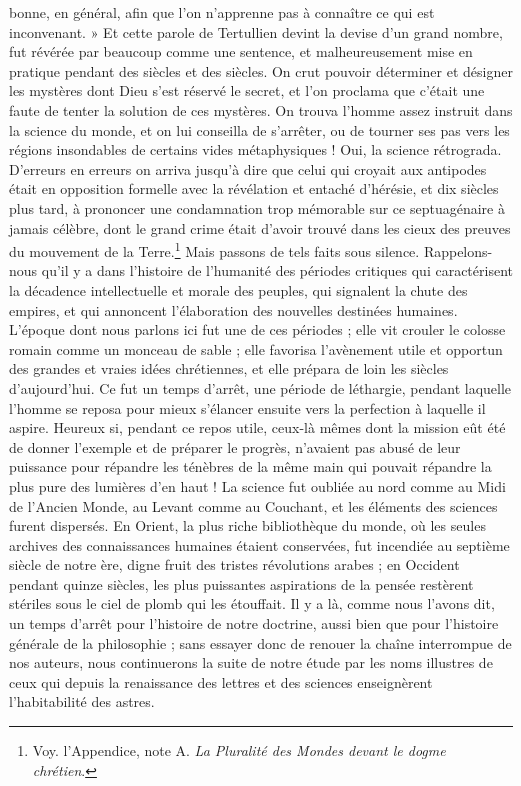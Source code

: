 \documentclass[a4paper, 11pt, oneside]{article}
\begin{document}
bonne, en général, afin que l'on n'apprenne pas à connaître ce qui est inconvenant. » Et cette parole de Tertullien devint la devise d'un grand nombre, fut révérée par beaucoup comme une sentence, et malheureusement mise en pratique pendant des siècles et des siècles. On crut pouvoir déterminer et désigner les mystères dont Dieu s'est réservé le secret, et l'on proclama que c'était une faute de tenter la solution de ces mystères. On trouva l'homme assez instruit dans la science du monde, et on lui conseilla de s'arrêter, ou de tourner ses pas vers les régions insondables de certains vides métaphysiques ! Oui, la science rétrograda. D'erreurs en erreurs on arriva jusqu'à dire que celui qui croyait aux antipodes était en opposition formelle avec la révélation et entaché d'hérésie, et dix siècles plus tard, à prononcer une condamnation trop mémorable sur ce septuagénaire à jamais célèbre, dont le grand crime était d'avoir trouvé dans les cieux des preuves du mouvement de la Terre.\footnote{Voy. l'Appendice, note A. \emph{La Pluralité des Mondes devant le dogme chrétien}.} Mais passons de tels faits sous silence. Rappelons-nous qu'il y a dans l'histoire de l'humanité des périodes critiques qui caractérisent la décadence intellectuelle et morale des peuples, qui signalent la chute des empires, et qui annoncent l'élaboration des nouvelles destinées humaines. L'époque dont nous parlons ici fut une de ces périodes ; elle vit crouler le colosse romain comme un monceau de sable ; elle favorisa l'avènement utile et opportun des grandes et vraies idées chrétiennes, et elle prépara de loin les siècles d'aujourd'hui. Ce fut un temps d'arrêt, une période de léthargie, pendant laquelle l'homme se reposa pour mieux s'élancer ensuite vers la perfection à laquelle il aspire. Heureux si, pendant ce repos utile, ceux-là mêmes dont la mission eût été de donner l'exemple et de préparer le progrès, n'avaient pas abusé de leur puissance pour répandre les ténèbres de la même main qui pouvait répandre la plus pure des lumières d'en haut ! La science fut oubliée au nord comme au Midi de l'Ancien Monde, au Levant comme au Couchant, et les éléments des sciences furent dispersés. En Orient, la plus riche bibliothèque du monde, où les seules archives des connaissances humaines étaient conservées, fut incendiée au septième siècle de notre ère, digne fruit des tristes révolutions arabes ; en Occident pendant quinze siècles, les plus puissantes aspirations de la pensée restèrent stériles sous le ciel de plomb qui les étouffait. Il y a là, comme nous l'avons dit, un temps d'arrêt pour l'histoire de notre doctrine, aussi bien que pour l'histoire générale de la philosophie ; sans essayer donc de renouer la chaîne interrompue de nos auteurs, nous continuerons la suite de notre étude par les noms illustres de ceux qui depuis la renaissance des lettres et des sciences enseignèrent l'habitabilité des astres.
\clearpage
\end{document}

